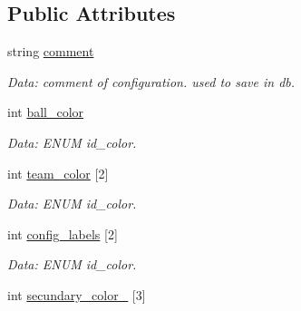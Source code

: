 \subsection*{Public Attributes}
\begin{DoxyCompactItemize}
\item 
string \hyperlink{structcommon_1_1ExecConfiguration_a98f8739d11ff3ab4e9e6f61a1d8084a4}{comment}\hypertarget{structcommon_1_1ExecConfiguration_a98f8739d11ff3ab4e9e6f61a1d8084a4}{}\label{structcommon_1_1ExecConfiguration_a98f8739d11ff3ab4e9e6f61a1d8084a4}

\begin{DoxyCompactList}\small\item\em Data\+: comment of configuration. used to save in db. \end{DoxyCompactList}\item 
int \hyperlink{structcommon_1_1ExecConfiguration_a08b7bbd7185afc2f9050850771af86c8}{ball\+\_\+color}\hypertarget{structcommon_1_1ExecConfiguration_a08b7bbd7185afc2f9050850771af86c8}{}\label{structcommon_1_1ExecConfiguration_a08b7bbd7185afc2f9050850771af86c8}

\begin{DoxyCompactList}\small\item\em Data\+: E\+N\+UM id\+\_\+color. \end{DoxyCompactList}\item 
int \hyperlink{structcommon_1_1ExecConfiguration_a2f8748f7ea7c3b21a580b9116efc5593}{team\+\_\+color} \mbox{[}2\mbox{]}\hypertarget{structcommon_1_1ExecConfiguration_a2f8748f7ea7c3b21a580b9116efc5593}{}\label{structcommon_1_1ExecConfiguration_a2f8748f7ea7c3b21a580b9116efc5593}

\begin{DoxyCompactList}\small\item\em Data\+: E\+N\+UM id\+\_\+color. \end{DoxyCompactList}\item 
int \hyperlink{structcommon_1_1ExecConfiguration_aa8dcf45e57d1a2e2264d75e2568e33bf}{config\+\_\+labels} \mbox{[}2\mbox{]}\hypertarget{structcommon_1_1ExecConfiguration_aa8dcf45e57d1a2e2264d75e2568e33bf}{}\label{structcommon_1_1ExecConfiguration_aa8dcf45e57d1a2e2264d75e2568e33bf}

\begin{DoxyCompactList}\small\item\em Data\+: E\+N\+UM id\+\_\+color. \end{DoxyCompactList}\item 
int \hyperlink{structcommon_1_1ExecConfiguration_a5485a96fed9500bddfd4a8ce81d9032c}{secundary\+\_\+color\+\_} \mbox{[}3\mbox{]}\hypertarget{structcommon_1_1ExecConfiguration_a5485a96fed9500bddfd4a8ce81d9032c}{}\label{structcommon_1_1ExecConfiguration_a5485a96fed9500bddfd4a8ce81d9032c}


\end{DoxyCompactItemize}
